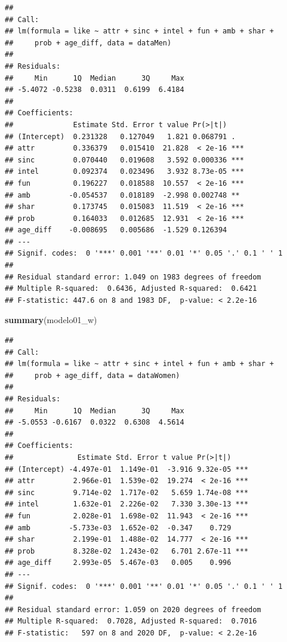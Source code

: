 \documentclass[]{article}
\newenvironment{Shaded}{\begin{snugshade}}{\end{snugshade}}
\newcommand{\KeywordTok}[1]{\textcolor[rgb]{0.13,0.29,0.53}{\textbf{#1}}}
\newcommand{\NormalTok}[1]{#1}
\begin{document}
\begin{verbatim}
## 
## Call:
## lm(formula = like ~ attr + sinc + intel + fun + amb + shar + 
##     prob + age_diff, data = dataMen)
## 
## Residuals:
##     Min      1Q  Median      3Q     Max 
## -5.4072 -0.5238  0.0311  0.6199  6.4184 
## 
## Coefficients:
##              Estimate Std. Error t value Pr(>|t|)    
## (Intercept)  0.231328   0.127049   1.821 0.068791 .  
## attr         0.336379   0.015410  21.828  < 2e-16 ***
## sinc         0.070440   0.019608   3.592 0.000336 ***
## intel        0.092374   0.023496   3.932 8.73e-05 ***
## fun          0.196227   0.018588  10.557  < 2e-16 ***
## amb         -0.054537   0.018189  -2.998 0.002748 ** 
## shar         0.173745   0.015083  11.519  < 2e-16 ***
## prob         0.164033   0.012685  12.931  < 2e-16 ***
## age_diff    -0.008695   0.005686  -1.529 0.126394    
## ---
## Signif. codes:  0 '***' 0.001 '**' 0.01 '*' 0.05 '.' 0.1 ' ' 1
## 
## Residual standard error: 1.049 on 1983 degrees of freedom
## Multiple R-squared:  0.6436, Adjusted R-squared:  0.6421 
## F-statistic: 447.6 on 8 and 1983 DF,  p-value: < 2.2e-16
\end{verbatim}

\begin{Shaded}
\begin{Highlighting}[]
\KeywordTok{summary}\NormalTok{(modelo01_w)}
\end{Highlighting}
\end{Shaded}

\begin{verbatim}
## 
## Call:
## lm(formula = like ~ attr + sinc + intel + fun + amb + shar + 
##     prob + age_diff, data = dataWomen)
## 
## Residuals:
##     Min      1Q  Median      3Q     Max 
## -5.0553 -0.6167  0.0322  0.6308  4.5614 
## 
## Coefficients:
##               Estimate Std. Error t value Pr(>|t|)    
## (Intercept) -4.497e-01  1.149e-01  -3.916 9.32e-05 ***
## attr         2.966e-01  1.539e-02  19.274  < 2e-16 ***
## sinc         9.714e-02  1.717e-02   5.659 1.74e-08 ***
## intel        1.632e-01  2.226e-02   7.330 3.30e-13 ***
## fun          2.028e-01  1.698e-02  11.943  < 2e-16 ***
## amb         -5.733e-03  1.652e-02  -0.347    0.729    
## shar         2.199e-01  1.488e-02  14.777  < 2e-16 ***
## prob         8.328e-02  1.243e-02   6.701 2.67e-11 ***
## age_diff     2.993e-05  5.467e-03   0.005    0.996    
## ---
## Signif. codes:  0 '***' 0.001 '**' 0.01 '*' 0.05 '.' 0.1 ' ' 1
## 
## Residual standard error: 1.059 on 2020 degrees of freedom
## Multiple R-squared:  0.7028, Adjusted R-squared:  0.7016 
## F-statistic:   597 on 8 and 2020 DF,  p-value: < 2.2e-16
\end{verbatim}
\end{document}
